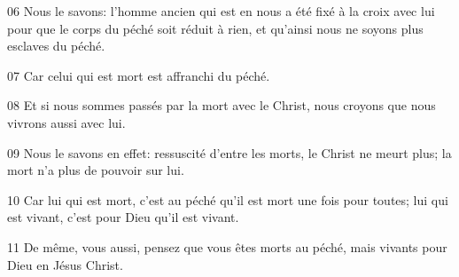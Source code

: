 
06 Nous le savons: l’homme ancien qui est en nous a été fixé à la croix avec lui pour que le corps du péché soit réduit à rien, et qu’ainsi nous ne soyons plus esclaves du péché.

07 Car celui qui est mort est affranchi du péché.

08 Et si nous sommes passés par la mort avec le Christ, nous croyons que nous vivrons aussi avec lui.

09 Nous le savons en effet: ressuscité d’entre les morts, le Christ ne meurt plus; la mort n’a plus de pouvoir sur lui.

10 Car lui qui est mort, c'est au péché qu'il est mort une fois pour toutes; lui qui est vivant, c'est pour Dieu qu'il est vivant.

11 De même, vous aussi, pensez que vous êtes morts au péché, mais vivants pour Dieu en Jésus Christ.
